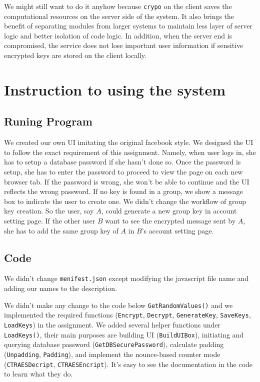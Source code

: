 We might still want to do it anyhow because \texttt{crypo} on the client saves the computational resources on the server side of the system. It also brings the benefit of separating modules from larger systems to maintain less layer of server logic and better isolation of code logic. In addition, when the server end is compromised, the service does not lose important user information if sensitive encrypted keys are stored on the client locally.

\section{Instruction to using the system}

\subsection{Runing Program}

We created our own UI imitating the original facebook style. We designed the UI to follow the exact requirement of this assignment. Namely, when user logs in, she has to setup a database password if she hasn't done so. Once the password is setup, she has to enter the password to proceed to view the page on each new browser tab. If the password is wrong, she won't be able to continue and the UI reflects the wrong password. If no key is found in a group, we show a message box to indicate the user to create one. 
We didn't change the workflow of group key creation. So the user, say $A$, could generate a new group key in account setting page. If the other user $B$ want to see the encrypted message sent by $A$, she has to add the same group key of $A$ in $B$'s account setting page.

\subsection{Code}

We didn't change \texttt{menifest.json} except modifying the javascript file name and adding our names to the description.

We didn't make any change to the code below \texttt{GetRandomValues()} and we implemented the required functions (\texttt{Encrypt}, \texttt{Decrypt}, \texttt{GenerateKey}, \texttt{SaveKeys}, \texttt{LoadKeys}) in the assignment. We added several helper functions under \texttt{LoadKeys()}, their main purposes are building UI (\texttt{BuildUIBox}), initiating and querying database password (\texttt{GetDBSecurePassword}), calculate padding (\texttt{Unpadding}, \texttt{Padding}), and implement the nounce-based counter mode (\texttt{CTRAESDecript}, \texttt{CTRAESEncript}). It's easy to see the documentation in the code to learn what they do.

